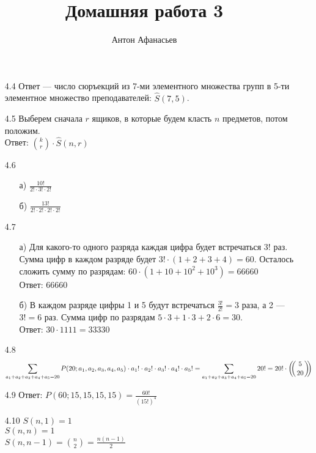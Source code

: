 \documentclass[10pt]{article}
\newcommand{\rchoose}[2]{\left(\mkern-6mu \left({#1 \atop #2}\right) \mkern-6mu \right)}
\begin{document}
\title{Домашняя работа 3}
\author{Антон Афанасьев}
\maketitle

\begin{enumerate}[label*=4.\arabic*]
	\item[4.4] Ответ --- число сюръекций из 7-ми элементного множества групп в 5-ти элементное множество преподавателей: $\hat S (7, 5)$.
	
	\item[4.5] Выберем сначала $r$ ящиков, в которые будем класть $n$ предметов, потом положим.\\
	Ответ: $ \binom{k}{r} \cdot \hat S(n, r)$
	
	\item[4.6]
	\begin{itemize}
		\item[а)] $\frac{10!}{2! \cdot 3! \cdot 2!}$
		\item[б)] $\frac{13!}{2! \cdot 2! \cdot 2! \cdot 2!}$
	\end{itemize}
	
	\item[4.7]
	\begin{itemize}
		\item[а)] Для какого-то одного разряда каждая цифра будет встречаться $3!$ раз. Сумма цифр в каждом разряде будет $3! \cdot (1+2+3+4) = 60$. Осталось сложить сумму по разрядам: $60 \cdot (1 + 10 + 10^2 +10^3) = 66660$\\
		Ответ: 66660
		\item[б)] В каждом разряде цифры 1 и 5 будут встречаться $\frac{3!}{2!} = 3$ раза, а 2 --- $3! = 6$ раз. Сумма цифр по разрядам $5 \cdot 3 + 1 \cdot 3 + 2 \cdot 6 = 30$.\\
		Ответ: $30 \cdot 1111 = 33330$
	\end{itemize}
	
	\item[4.8] 
	$$\sum_{a_1+a_2+a_3+a_4+a_5 = 20} P(20; a_1, a_2, a_3, a_4, a_5) \cdot a_1! \cdot a_2! \cdot a_3! \cdot a_4! \cdot a_5! = \sum_{a_1+a_2+a_3+a_4+a_5 = 20} 20! = 20! \cdot \rchoose{5}{20}$$
	
	\item[4.9] Ответ: $P(60; 15, 15, 15, 15) = \frac{60!}{(15!)^4}$
	
	\item[4.10] $S(n, 1) = 1$\\
		$S(n, n) = 1$\\
		$S(n, n-1) = \binom{n}{2} = \frac{n(n-1)}{2}$
\end{enumerate}
\end{document}
